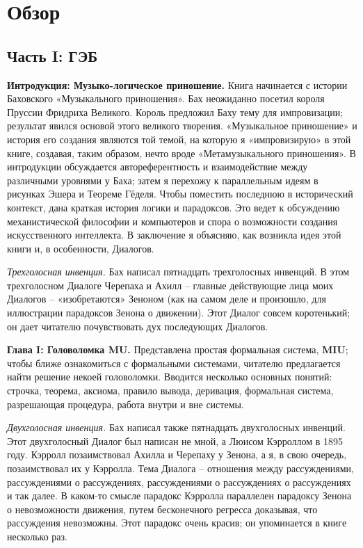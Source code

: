 \documentclass[../main.tex]{subfiles}
\begin{document}
\section{Обзор}

\subsection*{Часть I: ГЭБ}

\textbf{Интродукция: Музыко-логическое приношение.}
Книга начинается с истории Баховского «Музыкального приношения». Бах неожиданно посетил короля Пруссии Фридриха Великого. Король предложил Баху тему для импровизации; результат явился основой этого великого творения. «Музыкальное приношение» и история его создания являются той темой, на которую я «импровизирую» в этой книге, создавая, таким образом, нечто вроде «Метамузыкального приношения». В интродукции обсуждается автореферентность и взаимодействие между различными уровнями у Баха; затем я перехожу к параллельным идеям в рисунках Эшера и Теореме Гёделя. Чтобы поместить последнюю в исторический контекст, дана краткая история логики и парадоксов. Это ведет к обсуждению механистической философии и компьютеров и спора о возможности создания искусственного интеллекта. В заключение я объясняю, как возникла идея этой книги и, в особенности, Диалогов.

\emph{Трехголосная инвенция.}
Бах написал пятнадцать трехголосных инвенций. В этом трехголосном Диалоге Черепаха и Ахилл \--- главные действующие лица моих Диалогов \--- «изобретаются» Зеноном (как на самом деле и произошло, для иллюстрации парадоксов Зенона о движении). Этот Диалог совсем коротенький; он дает читателю почувствовать дух последующих Диалогов.

\textbf{Глава I: Головоломка MU.}
Представлена простая формальная система, \textbf{MIU}; чтобы ближе ознакомиться с формальными системами, читателю предлагается найти решение некоей головоломки. Вводится несколько основных понятий: строчка, теорема, аксиома, правило вывода, деривация, формальная система, разрешающая процедура, работа внутри и вне системы.

\emph{Двухголосная инвенция.}
Бах написал также пятнадцать двухголосных инвенций. Этот двухголосный Диалог был написан не мной, а Люисом Кэрроллом в 1895 году. Кэрролл позаимствовал Ахилла и Черепаху у Зенона, а я, в свою очередь, позаимствовал их у Кэрролла. Тема Диалога \--- отношения между рассуждениями, рассуждениями о рассуждениях, рассуждениями о рассуждениях о рассуждениях и так далее. В каком-то смысле парадокс Кэрролла параллелен парадоксу Зенона о невозможности движения, путем бесконечного регресса доказывая, что рассуждения невозможны. Этот парадокс очень красив; он упоминается в книге несколько раз.
\end{document}
